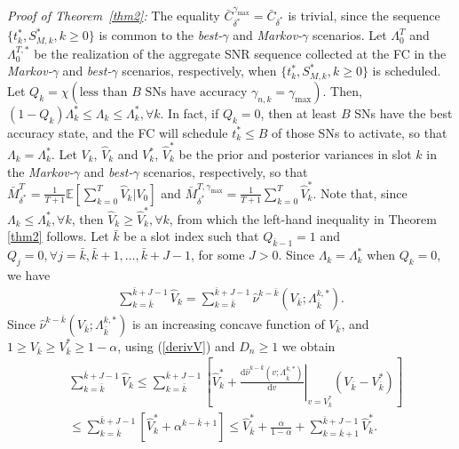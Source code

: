 \documentclass[10pt,twocolumn,twoside]{IEEEtran}
\theoremstyle{plain}
\begin{document}
 \section{}
 \label{Proofthm2}
\noindent\emph{Proof of Theorem~\ref{thm2}:}
The equality $\bar C_{\delta^*}^{\gamma_{\max}}{=}\bar C_{\delta^*}$ is trivial, since
the sequence $\{t_k^*,S_{M,k}^*,k{\geq}0\}$ is common to the \emph{best-}$\gamma$ and \emph{Markov-}$\gamma$ scenarios.
Let $\Lambda_0^T$ and $\Lambda_0^{T,*}$ be the realization of the aggregate SNR sequence collected at the FC in the \emph{Markov-}$\gamma$ and \emph{best-}$\gamma$ scenarios, respectively, when
 $\{t_k^*,S_{M,k}^*,k{\geq}0\}$ is scheduled.
Let $Q_k{=}\chi(\text{less than $B$ SNs have accuracy $\gamma_{n,k}{=}\gamma_{\max}$})$.
Then,  $(1{-}Q_k)\Lambda_k^*{\leq}\Lambda_k{\leq}\Lambda_k^*,\forall k$.
In fact, if $Q_k{=}0$, then at least $B$ SNs have the best accuracy state,
and the FC will schedule $t_k^*{\leq}B$ of those SNs to activate, so that
 $\Lambda_k{=}\Lambda_k^*$.
Let $V_k$, $\hat V_k$ and $V_k^*$, $\hat V_k^*$ be the prior and posterior variances in slot $k$
in the \emph{Markov-}$\gamma$  and \emph{best-}$\gamma$ scenarios, respectively, so that 
$\bar M_{\delta^*}^{T}=\frac{1}{T+1}\mathbb E\left[\sum_{k=0}^T\hat V_k|V_0\right]$ and
$\bar M_{\delta^*}^{T,\gamma_{\max}}=\frac{1}{T+1}\sum_{k=0}^T\hat V_k^*$.
Note that, since $\Lambda_k{\leq}\Lambda_k^*,\forall k$, then $\hat V_k{\geq}\hat V_k^*,\forall k$, from which
the left-hand inequality in Theorem \ref{thm2} follows.
Let $\bar k$ be a slot index such that $Q_{\bar k-1}{=}1$ and $Q_j{=}0,\forall j{=}\bar k,\bar k{+}1,\dots,\bar k{+}J{-}1$, for some $J{>}0$.
Since $\Lambda_k{=}\Lambda_k^*$ when $Q_k{=}0$, we have
\begin{align}
\sum_{k=\bar k}^{\bar k+J-1}\hat V_k=
\sum_{k=\bar k}^{\bar k+J-1}\hat\nu^{k-\bar k}(V_{\bar k};\Lambda_{\bar k}^{k,*}).
\end{align}
Since $\hat\nu^{k-\bar k}(V_{\bar k};\Lambda_{\bar k}^{k,*})$ is an increasing concave function of $V_{\bar k}$,
and $1\geq V_{\bar k}\geq V_{\bar k}^*\geq 1-\alpha$,
 using (\ref{derivV}) and $D_n\geq 1$ we obtain
\begin{align*}
&\sum_{k=\bar k}^{\bar k+J-1}\hat V_k\leq\!\!\!\!
\sum_{k=\bar k}^{\bar k+J-1}\left[\hat V_k^*
+
\left.\frac{\mathrm d\hat\nu^{k-\bar k}(v;\Lambda_{\bar k}^{k,*})}{\mathrm d v}\right|_{v=V_{\bar k}^*}\!\!\!\!\!\!\!\!\!\!(V_{\bar k}-V_{\bar k}^*)\right]
\nonumber\\&
\leq
\sum_{k=\bar k}^{\bar k+J-1}\left[\hat V_k^*+\alpha^{k-\bar k+1}\right]
\leq
\hat V_{\bar k}^*+\frac{\alpha}{1-\alpha}+\sum_{k=\bar k+1}^{\bar k+J-1}\hat V_k^*.
\end{align*}
\end{document}
